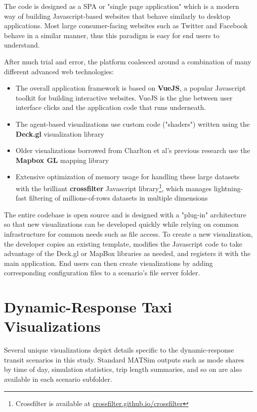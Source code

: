 The code is designed as a \gls{SPA} or "single page application" which is a modern way of building Javascript-based websites that behave similarly to desktop applications. Most large consumer-facing websites such as Twitter and Facebook behave in a similar manner, thus this paradigm is easy for end users to understand.

After much trial and error, the platform coalesced around a combination of many different advanced web technologies:

\begin{itemize}
  \item The overall application framework is based on \textbf{VueJS}, a popular Javascript toolkit for building interactive websites. VueJS is the glue between user interface clicks and the application code that runs underneath.
  \item The agent-based visualizations use custom code ("shaders") written using the \textbf{Deck.gl} visualization library
  \item Older visualizations borrowed from Charlton et al's previous research use the \textbf{Mapbox GL} mapping library
  \item Extensive optimization of memory usage for handling these large datasets with the brilliant \textbf{crossfilter} Javascript library\footnote{Crossfilter is available at \href{https://crossfilter.github.io/crossfilter/}{crossfilter.github.io/crossfilter}}, which manages lightning-fast filtering of millions-of-rows datasets in multiple dimensions
\end{itemize}

The entire codebase is open source and is designed with a "plug-in" architecture so that new visualizations can be developed quickly while relying on common infrastructure for common needs such as file access. To create a new visualization, the developer copies an existing template, modifies the Javascript code to take advantage of the Deck.gl or MapBox libraries as needed, and registers it with the main application. End users can then create visualizations by adding corresponding configuration files to a scenario's file server folder.

\section{Dynamic-Response Taxi Visualizations}
\label{avov-drtviz}

Several unique visualizations depict details specific to the dynamic-response transit scenarios in this study. Standard MATSim outputs such as mode shares by time of day, simulation statistics, trip length summaries, and so on are also available in each scenario subfolder.

